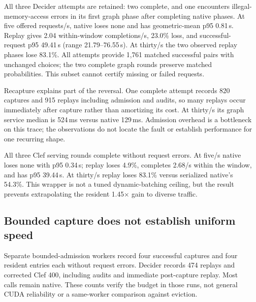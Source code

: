 \documentclass[10pt,twocolumn]{article}
\begin{document}
All three Decider attempts are retained: two complete, and one encounters illegal-memory-access errors in its first graph phase after completing native phases. At five offered requests/s, native loses none and has geometric-mean p95 0.81\,s. Replay gives 2.04 within-window completions/s, 23.0\% loss, and successful-request p95 49.41\,s (range 21.79--76.55\,s). At thirty/s the two observed replay phases lose 83.1\%. All attempts provide 1,761 matched successful pairs with unchanged choices; the two complete graph rounds preserve matched probabilities. This subset cannot certify missing or failed requests.

Recapture explains part of the reversal. One complete attempt records 820 captures and 915 replays including admission and audits, so many replays occur immediately after capture rather than amortizing its cost. At thirty/s its graph service median is 524\,ms versus native 129\,ms. Admission overhead is a bottleneck on this trace; the observations do not locate the fault or establish performance for one recurring shape.

All three Clef serving rounds complete without request errors. At five/s native loses none with p95 0.34\,s; replay loses 4.9\%, completes 2.68/s within the window, and has p95 39.44\,s. At thirty/s replay loses 83.1\% versus serialized native's 54.3\%. This wrapper is not a tuned dynamic-batching ceiling, but the result prevents extrapolating the resident 1.45$\times$ gain to diverse traffic.

\begin{table}[t]
\centering\small

\caption{External serving with 60-second phases. $n$ counts observed container phases, including failed rounds. Completed/s counts within-window responses; p95 is the geometric mean of successful-request container quantiles. Loss includes all drops and errors. Later completions, p99, drain time, and unmatched requests remain archived.}
\label{tab:serving}
\end{table}

\subsection{Bounded capture does not establish uniform speed}
Separate bounded-admission workers record four successful captures and four resident entries each without request errors. Decider records 474 replays and corrected Clef 400, including audits and immediate post-capture replay. Most calls remain native. These counts verify the budget in those runs, not general CUDA reliability or a same-worker comparison against eviction.
\end{document}
